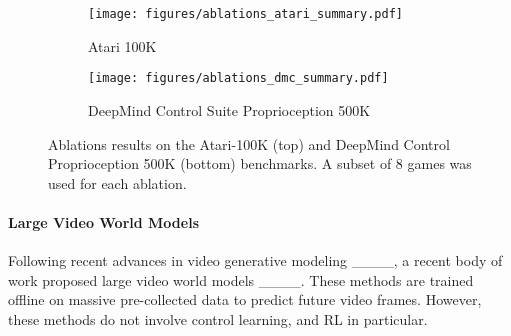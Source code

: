 \begin{figure}[t]
    \centering

    
\begin{subfigure}[b]{\linewidth}
   \texttt{[image: figures/ablations\_atari\_summary.pdf]}
   \caption{Atari 100K}
   \label{fig:ablations-atari}
\end{subfigure}
\vskip 0.1in
\begin{subfigure}[b]{\linewidth}
   \texttt{[image: figures/ablations\_dmc\_summary.pdf]}
   \caption{DeepMind Control Suite Proprioception 500K}
   \label{fig:ablations-dmc}
\end{subfigure}
    
    \caption{Ablations results on the Atari-100K (top) and DeepMind Control Proprioception 500K (bottom) benchmarks. A subset of 8 games was used for each ablation.}
    \label{fig:ablations-results}
\end{figure}





\paragraph{Large Video World Models}
Following recent advances in video generative modeling ____, a recent body of work proposed large video world models ____.
These methods are trained offline on massive pre-collected data to predict future video frames.
However, these methods do not involve control learning, and RL in particular.


